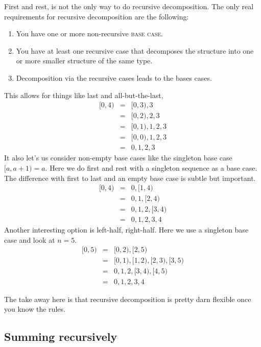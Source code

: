 \documentclass[]{tufte-handout}
\begin{document}
First and rest, is not the only way to do recursive decomposition. The only real requirements for recursive decomposition are the following:
\begin{enumerate}
\item You have one or more non-recursive \textsc{base case}.
\item You have at least one recursive case that decomposes the structure into one or more smaller structure of the same type.
\item Decomposition via the recursive cases leads to the bases cases.
\end{enumerate}
This allows for things like last and all-but-the-last,
\begin{equation*}
\begin{array}{rcl}
[0,4) &=& [0,3),3 \\
 &=& [0,2),2,3 \\
 &=& [0,1),1,2,3 \\
 &=& [0,0),1,2,3 \\
 &=& 0,1,2,3 
\end{array}
\end{equation*}
It also let's us consider non-empty base cases like the singleton base case $[a,a+1) = a$. Here we do first and rest with a singleton sequence as a base case. The difference with first to last and an empty base case is subtle but important.
\begin{equation*}
\begin{array}{rcl}
[0,4) &=& 0,[1,4) \\
 &=& 0,1,[2,4) \\
 &=& 0,1,2,[3,4) \\
 &=& 0,1,2,3,4
\end{array}
\end{equation*}
Another interesting option is left-half, right-half.  Here we use a singleton base case and look at $n=5$.
\begin{equation*}
\begin{array}{rcl}
[0,5) &=& [0,2),[2,5) \\
 &=& [0,1),[1,2),[2,3),[3,5) \\
 &=& 0,1,2,[3,4),[4,5) \\
 &=& 0,1,2,3,4
\end{array}
\end{equation*}

The take away here is that recursive decomposition is pretty darn flexible once you know the rules. 

\subsection{Summing recursively}
\end{document}
